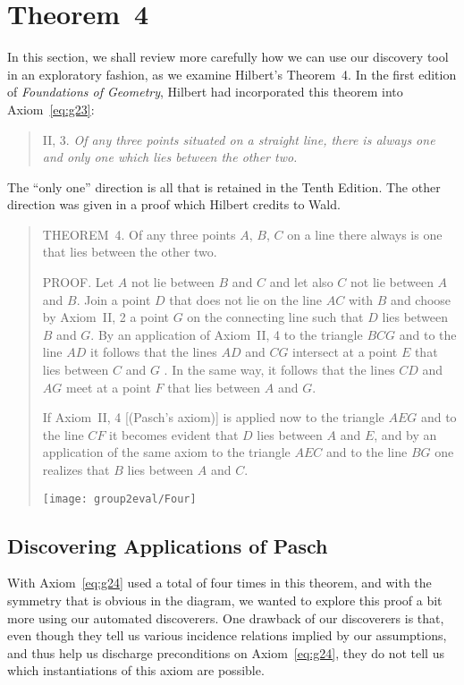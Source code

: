 \section{Theorem~4}
In this section, we shall review more carefully how we can use our discovery tool in an exploratory fashion, as we examine Hilbert's Theorem~4. In the first edition of \emph{Foundations of Geometry}, Hilbert had incorporated this theorem into Axiom~\ref{eq:g23}:
\begin{quotation}
  II, 3. \emph{Of any three points situated on a straight line, there is always one and only one which lies between the other two.}
\end{quotation}

The ``only one'' direction is all that is retained in the Tenth Edition. The other direction was given in a proof which Hilbert credits to Wald.
\begin{quotation}
  THEOREM~4. Of any three points $A$, $B$, $C$ on a line there always is one that lies between the other two.

  PROOF. Let $A$ not lie between $B$ and $C$ and let also $C$ not lie between $A$ and $B$. Join a point $D$ that does not lie on the line $AC$ with $B$ and choose by Axiom~II, 2 a point $G$ on the connecting line such that $D$ lies between $B$ and $G$. By an application of Axiom~II, 4 to the triangle $BCG$ and to the line $AD$ it follows that the lines $AD$ and $CG$ intersect at a point $E$ that lies between $C$ and $G$ . In the same way, it follows that the lines $CD$ and $AG$ meet at a point $F$ that lies between $A$ and $G$.

If Axiom~II, 4 [(Pasch's axiom)] is applied now to the triangle $AEG$ and to the line $CF$ it becomes evident that $D$ lies between $A$ and $E$, and by an application of the same axiom to the triangle $AEC$ and to the line $BG$ one realizes that $B$ lies between $A$ and $C$.

\centering \texttt{[image: group2eval/Four]}
\end{quotation}

\subsection{Discovering Applications of Pasch}\label{sec:PaschDiscoverer}
With Axiom~\ref{eq:g24} used a total of four times in this theorem, and with the symmetry that is obvious in the diagram, we wanted to explore this proof a bit more using our automated discoverers. One drawback of our discoverers is that, even though they tell us various incidence relations implied by our assumptions, and thus help us discharge preconditions on Axiom~\ref{eq:g24}, they do not tell us which instantiations of this axiom are possible.

